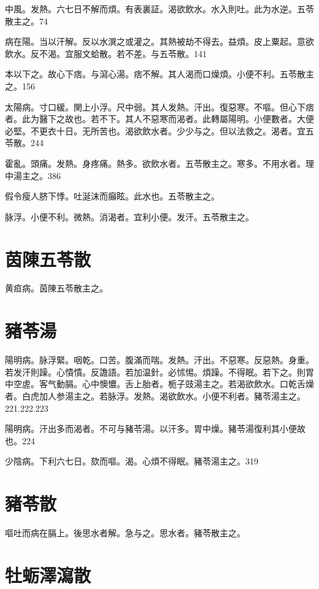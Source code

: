 \documentclass[b5paper,twoside,zihao=-4,UTF8]{ctexbook}
\begin{document}
中風。发熱。六七日不解而煩。有表裏証。渴欲飲水。水入則吐。此为水逆。五苓散主之。74

病在陽。当以汗解。反以水潠之或灌之。其熱被劫不得去。益煩。皮上粟起。意欲飲水。反不渴。宜服文蛤散。若不差。与五苓散。141

本以下之。故心下痞。与瀉心湯。痞不解。其人渴而口燥{煩}。小便不利。五苓散主之。156

太陽病。寸{口}緩。関{上小}浮。尺{中}弱。其人发熱。汗出。復惡寒。不嘔。但心下痞者。此为醫下之故也。若不下。其人不惡寒而渴者。此轉屬陽明。小便數者。大便必堅。不更衣十日。无所苦也。{渴}欲飲水者。少少与之。但以法救之。渴者。宜五苓散。244

霍亂。頭痛。发熱。身疼痛。熱多。欲飲水者。五苓散主之。寒多。不用水者。理中湯主之。386

假令瘦人脐下悸。吐涎沫而癲眩。此水也。五苓散主之。

脉浮。小便不利。微熱。消渴者。宜利小便。发汗。五苓散主之。

\section{茵陳五苓散}

黄疸病。茵陳五苓散主之。

\section{豬苓湯}

陽明病。脉浮緊。咽乾。口苦。腹滿而喘。发熱。汗出。不惡寒。反惡熱。身重。若发汗則躁。心憒憒。反譫語。若加温針。必怵惕。煩躁。不得眠。若下之。則胃中空虗。客气動膈。心中懊憹。舌上胎者。栀子{豉}湯主之。若渴欲飲水。口乾舌燥者。白虎{加人参}湯主之。若脉浮。发熱。渴欲飲水。小便不利者。豬苓湯主之。221.222.223

陽明病。汗出多而渴者。不可与豬苓湯。以汗多。胃中燥。豬苓湯復利其小便故也。224

少陰病。下利六七日。欬而嘔。渴。心煩不得眠。豬苓湯主之。319

\section{豬苓散}

嘔吐而病在膈上。後思水者解。急与之。思水者。豬苓散主之。

\section{牡蛎澤瀉散}
\end{document}

